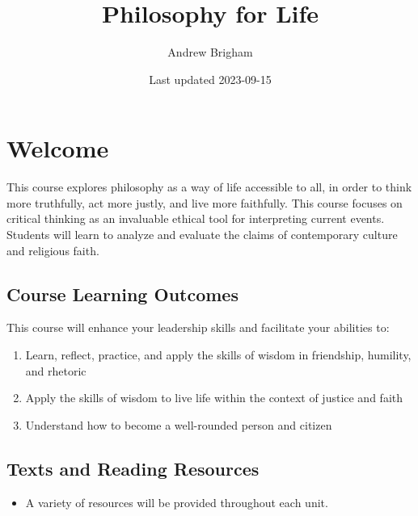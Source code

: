 \documentclass[
]{book}
\title{Philosophy for Life}
\author{Andrew Brigham}
\date{Last updated 2023-09-15}
\providecommand{\tightlist}{%
  \setlength{\itemsep}{0pt}\setlength{\parskip}{0pt}}
\begin{document}
\maketitle

{
\setcounter{tocdepth}{1}
\tableofcontents
}
\hypertarget{welcome}{%
\chapter*{Welcome}\label{welcome}}

This course explores philosophy as a way of life accessible to all, in order to think more truthfully, act more justly, and live more faithfully. This course focuses on critical thinking as an invaluable ethical tool for interpreting current events. Students will learn to analyze and evaluate the claims of contemporary culture and religious faith.

\hypertarget{course-learning-outcomes}{%
\section*{Course Learning Outcomes}\label{course-learning-outcomes}}

This course will enhance your leadership skills and facilitate your abilities to:

\begin{enumerate}
\def\labelenumi{\arabic{enumi}.}
\tightlist
\item
  Learn, reflect, practice, and apply the skills of wisdom in friendship, humility, and rhetoric\\
\item
  Apply the skills of wisdom to live life within the context of justice and faith\\
\item
  Understand how to become a well-rounded person and citizen
\end{enumerate}

\hypertarget{texts-and-reading-resources}{%
\section*{Texts and Reading Resources}\label{texts-and-reading-resources}}

\begin{itemize}
\tightlist
\item
  A variety of resources will be provided throughout each unit.
\end{itemize}
\end{document}
